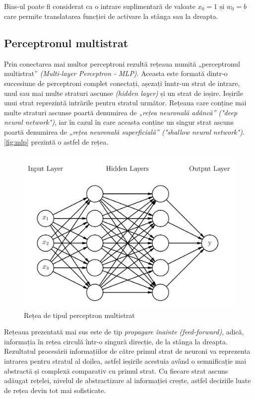 Bias-ul poate fi considerat ca o intrare suplimentară de valoate $x_0 = 1 \text{ și } w_0 = b$ care permite translatarea funcției de activare la stânga sau la dreapta.

\subsection{Perceptronul multistrat}\label{subsec:mlp}
Prin conectarea mai multor perceptroni rezultă rețeaua numită „perceptronul multistrat” \textit{(Multi-layer Perceptron - MLP)}. Aceasta este formată dintr-o succesiune de perceptroni complet conectați, așezați înntr-un strat de intrare, unul sau mai multe straturi ascunse \textit{(hidden layer)} și un strat de ieșire. Ieșirile unui strat reprezintă intrările pentru stratul următor. Rețeaua care conține mai multe straturi ascunse poartă denumirea de \textit{„rețea neuronală adâncă” ("deep neural network")}, iar în cazul în care aceasta conține un singur strat ascuns poartă denumirea de \textit{„rețea neuronală superficială” ("shallow neural network")}. \autoref{fig:mlp} prezintă o astfel de rețea.

\begin{figure}[ht]
\center
\includegraphics[width=\textwidth, keepaspectratio]{fig/cap2/mlp.png}
\caption{Rețea de tipul perceptron multistrat}
\label{fig:mlp}
\end{figure}

Rețeaua prezentată mai sus este de tip \textit{propagare înainte (feed-forward)}, adică, informația în rețea circulă într-o singură direcție, de la stânga la dreapta. Rezultatul procesării informațiilor de către primul strat de neuroni va reprezenta intrarea pentru stratul al doilea, astfel ieșirile acestuia având o semnificație mai abstractă și complexă comparativ cu primul strat. Cu fiecare strat ascuns adăugat rețelei, nivelul de abstractizare al informației crește, astfel deciziile luate de rețea devin tot mai sofisticate.

